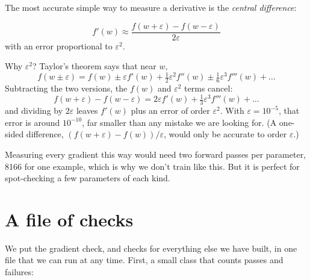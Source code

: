 \documentclass[11pt,a4paper,oneside,openany]{book}
\begin{document}
The most accurate simple way to measure a derivative is the
\emph{central difference}:

\begin{mathbox}
\[
  f'(w) \approx \frac{f(w + \varepsilon) - f(w - \varepsilon)}{2\varepsilon}
\]
with an error proportional to $\varepsilon^2$.
\end{mathbox}

Why $\varepsilon^2$? Taylor's theorem says that near $w$,
\[
  f(w \pm \varepsilon) = f(w) \pm \varepsilon f'(w) + \tfrac12\varepsilon^2 f''(w) \pm \tfrac16\varepsilon^3 f'''(w) + \dots
\]
Subtracting the two versions, the $f(w)$ and $\varepsilon^2$ terms cancel:
\[
  f(w+\varepsilon) - f(w-\varepsilon) = 2\varepsilon f'(w) + \tfrac13\varepsilon^3 f'''(w) + \dots
\]
and dividing by $2\varepsilon$ leaves $f'(w)$ plus an error of order
$\varepsilon^2$. With $\varepsilon = 10^{-5}$, that error is around
$10^{-10}$, far smaller than any mistake we are looking for. (A one-sided
difference, $(f(w+\varepsilon) - f(w))/\varepsilon$, would only be
accurate to order $\varepsilon$.)

Measuring every gradient this way would need two forward passes per
parameter, 8166 for one example, which is why we don't train like this.
But it is perfect for spot-checking a few parameters of each kind.

\section{A file of checks}

We put the gradient check, and checks for everything else we have built,
in one file that we can run at any time. First, a small class that counts
passes and failures:
\end{document}

